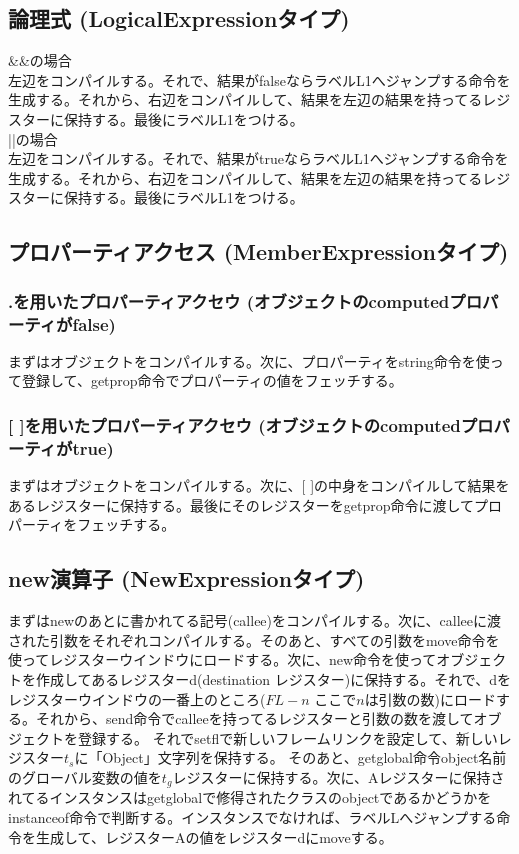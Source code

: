 \documentclass[12pt]{article}
\begin{document}
\subsection{論理式 (LogicalExpressionタイプ)}
\&\&の場合\\
左辺をコンパイルする。それで、結果がfalseならラベルL1へジャンプする命令を生成する。それから、右辺をコンパイルして、結果を左辺の結果を持ってるレジスターに保持する。最後にラベルL1をつける。\\

||の場合\\
左辺をコンパイルする。それで、結果がtrueならラベルL1へジャンプする命令を生成する。それから、右辺をコンパイルして、結果を左辺の結果を持ってるレジスターに保持する。最後にラベルL1をつける。\\

\subsection{プロパーティアクセス (MemberExpressionタイプ)}
\subsubsection{.を用いたプロパーティアクセウ (オブジェクトのcomputedプロパーティがfalse)}
まずはオブジェクトをコンパイルする。次に、プロパーティをstring命令を使って登録して、getprop命令でプロパーティの値をフェッチする。

\subsubsection{[ ]を用いたプロパーティアクセウ (オブジェクトのcomputedプロパーティがtrue)}
まずはオブジェクトをコンパイルする。次に、[ ]の中身をコンパイルして結果をあるレジスターに保持する。最後にそのレジスターをgetprop命令に渡してプロパーティをフェッチする。

\subsection{new演算子 (NewExpressionタイプ)}
まずはnewのあとに書かれてる記号(callee)をコンパイルする。次に、calleeに渡された引数をそれぞれコンパイルする。そのあと、すべての引数をmove命令を使ってレジスターウインドウにロードする。次に、new命令を使ってオブジェクトを作成してあるレジスターd(destination レジスター)に保持する。それで、dをレジスターウインドウの一番上のところ($FL-n$ ここで$n$は引数の数)にロードする。それから、send命令でcalleeを持ってるレジスターと引数の数を渡してオブジェクトを登録する。
それでsetflで新しいフレームリンクを設定して、新しいレジスター$t_s$に「Object」文字列を保持する。
そのあと、getglobal命令object名前のグローバル変数の値を$t_g$レジスターに保持する。次に、Aレジスターに保持されてるインスタンスはgetglobalで修得されたクラスのobjectであるかどうかをinstanceof命令で判断する。インスタンスでなければ、ラベルLへジャンプする命令を生成して、レジスターAの値をレジスターdにmoveする。
\end{document}
